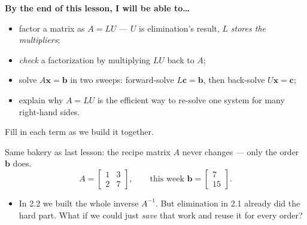 \documentclass[10pt]{article}
\newcommand{\xx}{\mathbf{x}}
\newcommand{\bb}{\mathbf{b}}
\newcommand{\cc}{\mathbf{c}}
\begin{document}

\vspace{0.12in}

\begin{objectivebox}
\textbf{By the end of this lesson, I will be able to\dots}
\begin{itemize}\setlength{\itemsep}{2pt}
  \item factor a matrix as $A=LU$ --- $U$ is elimination's result, $L$ \emph{stores the multipliers};
  \item \emph{check} a factorization by multiplying $LU$ back to $A$;
  \item solve $A\xx=\bb$ in two sweeps: forward-solve $L\cc=\bb$, then back-solve $U\xx=\cc$;
  \item explain why $A=LU$ is the efficient way to re-solve one system for many right-hand sides.
\end{itemize}
\end{objectivebox}

\vspace{0.10in}

\begin{vocabbox}
\small
Fill in each term as we build it together.
\par\vspace{2pt}
\end{vocabbox}

\begin{hookbox}
Same bakery as last lesson: the recipe matrix $A$ never changes --- only the order $\bb$ does.
\[
  A = \begin{bmatrix} 1 & 3 \\ 2 & 7 \end{bmatrix}, \qquad
  \text{this week } \bb = \begin{bmatrix} 7 \\ 15 \end{bmatrix}.
\]
\begin{itemize}\setlength{\itemsep}{1pt}
  \item In 2.2 we built the whole inverse $A^{-1}$. But elimination in 2.1 already did the hard part.
        What if we could just \emph{save} that work and reuse it for every order? \writeline
\end{itemize}
\end{hookbox}
\end{document}
